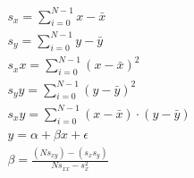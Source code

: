 \begin{gather}
s_x = \sum_{i=0}^{N-1} x - \bar{x}\\
s_y = \sum_{i=0}^{N-1} y - \bar{y}\\
s_xx = \sum_{i=0}^{N-1} (x - \bar{x})^2\\
s_yy = \sum_{i=0}^{N-1} (y - \bar{y})^2\\
s_xy = \sum_{i=0}^{N-1} (x - \bar{x}) \cdot (y - \bar{y})\\
y = \alpha + \beta x + \epsilon\\
\beta = \frac{(N s_{xy}) - (s_x s_y)}{N s_{xx} - s_x^2}
\label{formula_linear_regression}
\end{gather}
